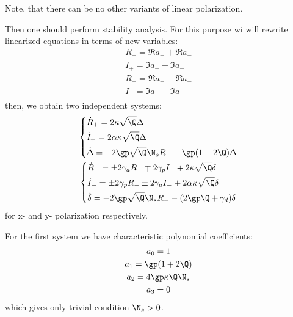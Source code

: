 \documentclass[12pt, notitlepage]{report}
\begin{document}
Note, that there can be no other variants of linear polarization. 

Then one should perform stability analysis. For this purpose wi will rewrite linearized equations in terms of new variables:
\begin{gather}
	R_+ = \Re a_+ + \Re a_- \\
	I_+ = \Im a_+ + \Im a_- \\
	R_- = \Re a_+ - \Re a_- \\
	I_- = \Im a_+ - \Im a_-
\end{gather}
then, we obtain two independent systems:
\begin{gather}
	\left\{\begin{align}
		&\dot{R}_+ = 2\kappa\sqrt{\Q}\Delta \\
		&\dot{I}_+ = 2\alpha\kappa\sqrt{\Q}\Delta \\
		&\dot{\Delta} = -2\gp\sqrt{\Q}\N_s R_+ - \gp(1+2\Q)\Delta
	\end{align}\right.\\
	\left\{\begin{align}
		&\dot{R}_- = \pm2\gamma_a R_- \mp 2\gamma_p I_- + 2\kappa\sqrt{\Q}\delta \\
		&\dot{I}_- = \pm2\gamma_p R_- \pm 2\gamma_a I_- + 2\alpha\kappa\sqrt{\Q}\delta \\
		&\dot{\delta} = -2\gp\sqrt{\Q}\N_s R_- - (2\gp\Q + \gamma_d)\delta
	\end{align}\right.
\end{gather}
for x- and y- polarization respectively.

For the first system we have characteristic polynomial coefficients:
\begin{gather}
	a_0 = 1\\
	a_1 = \gp(1+2\Q)\\
	a_2 = 4\gp\kappa\Q\N_s \\
	a_3 = 0
\end{gather}
which gives only trivial condition $\N_s > 0$.
\end{document}
